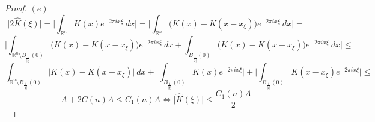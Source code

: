 \documentclass[12pt]{article}
\newenvironment{exercise}[2][Exercise]{\begin{trivlist}
\item[\hskip \labelsep {\bfseries #1}\hskip \labelsep {\bfseries #2.}]}{\end{trivlist}}
\begin{document}
\begin{proof}
  $(e)$
  $$\Big| 2\hat{K}(\xi) \Big| = \Big| \int_{\mathbb{R}^n} K(x) e^{-2 \pi i x \xi}\ dx \Big| = \Big|\int_{\mathbb{R}^n} \Big( K(x) - K(x - x_{\xi}) \Big) e^{-2 \pi i x \xi}\ dx \Big| =$$
  $$\Big|\int_{\mathbb{R}^n \setminus B_\frac{1}{|\xi|}(0)} \Big( K(x) - K(x - x_{\xi}) \Big) e^{-2 \pi i x \xi}\ dx + \int_{B_\frac{1}{|\xi|}(0)} \Big( K(x) - K(x - x_{\xi}) \Big) e^{-2 \pi i x \xi}\ dx\Big| \le$$
  $$\int_{\mathbb{R}^n \setminus B_\frac{1}{|\xi|}(0)} \Big| K(x) - K(x - x_{\xi}) \Big|\ dx + \Big|\int_{B_\frac{1}{|\xi|}(0)} K(x)e^{-2 \pi i x \xi}\Big| + \Big| \int_{B_\frac{1}{|\xi|}(0)} K(x-x_\xi)e^{-2 \pi i x \xi} \Big| \le$$
  $$A + 2C(n)A \le C_1(n)A \iff \Big| \hat{K}(\xi) \Big| \le \frac{C_1(n)A}{2}$$
\end{proof}

\begin{exercise}{3}
\end{exercise}
\end{document}
